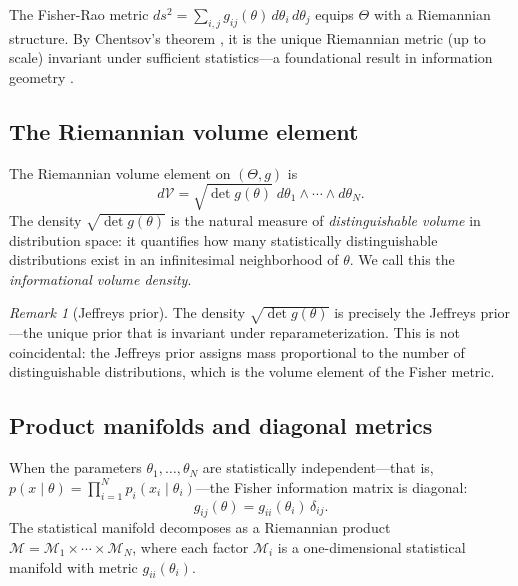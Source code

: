 \documentclass[12pt, a4paper]{article}
\theoremstyle{definition}
\theoremstyle{remark}
\newtheorem{remark}[theorem]{Remark}
\begin{document}
The Fisher-Rao metric $ds^2 = \sum_{i,j} g_{ij}(\theta) \, d\theta_i \, d\theta_j$ equips $\Theta$ with a Riemannian structure. By Chentsov's theorem \cite{chentsov1982}, it is the unique Riemannian metric (up to scale) invariant under sufficient statistics---a foundational result in information geometry \cite{amari2016}.

\subsection{The Riemannian volume element}

The Riemannian volume element on $(\Theta, g)$ is
\begin{equation}\label{eq:volume}
d\mathcal{V} = \sqrt{\det g(\theta)} \; d\theta_1 \wedge \cdots \wedge d\theta_N.
\end{equation}
The density $\sqrt{\det g(\theta)}$ is the natural measure of \textit{distinguishable volume} in distribution space: it quantifies how many statistically distinguishable distributions exist in an infinitesimal neighborhood of $\theta$. We call this the \textit{informational volume density}.

\begin{remark}[Jeffreys prior]
The density $\sqrt{\det g(\theta)}$ is precisely the Jeffreys prior \cite{jeffreys1946}---the unique prior that is invariant under reparameterization. This is not coincidental: the Jeffreys prior assigns mass proportional to the number of distinguishable distributions, which is the volume element of the Fisher metric.
\end{remark}

\subsection{Product manifolds and diagonal metrics}

When the parameters $\theta_1, \ldots, \theta_N$ are statistically independent---that is, $p(x \mid \theta) = \prod_{i=1}^{N} p_i(x_i \mid \theta_i)$---the Fisher information matrix is diagonal:
\begin{equation}\label{eq:diagonal}
g_{ij}(\theta) = g_{ii}(\theta_i) \, \delta_{ij}.
\end{equation}
The statistical manifold decomposes as a Riemannian product $\mathcal{M} = \mathcal{M}_1 \times \cdots \times \mathcal{M}_N$, where each factor $\mathcal{M}_i$ is a one-dimensional statistical manifold with metric $g_{ii}(\theta_i)$.

\end{document}
